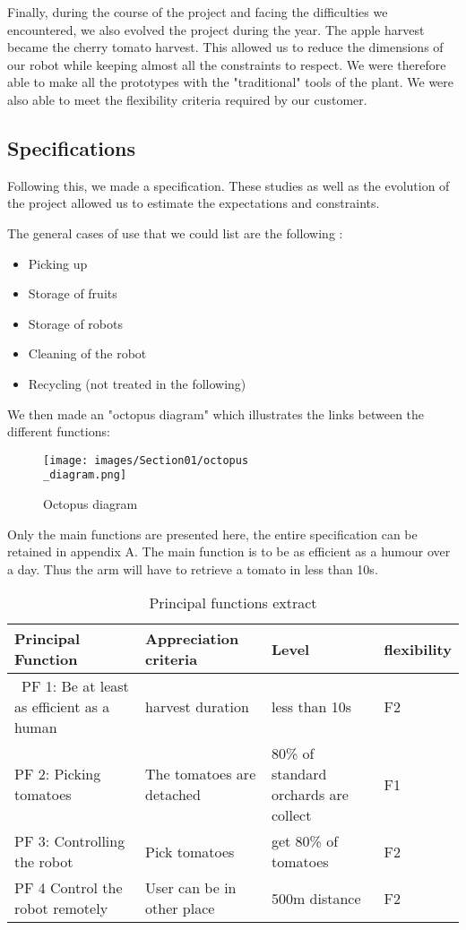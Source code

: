 \bigbreak
Finally, during the course of the project and facing the difficulties we encountered, we also evolved the project during the year. The apple harvest became the cherry tomato harvest. This allowed us to reduce the dimensions of our robot while keeping almost all the constraints to respect. We were therefore able to make all the prototypes with the "traditional" tools of the plant. We were also able to meet the flexibility criteria required by our customer. 

\subsection{Specifications}

Following this, we made a specification. These studies as well as the evolution of the project allowed us to estimate the expectations and constraints. 

\bigbreak
\noindent The general cases of use that we could list are the following : 
\begin{itemize}[noitemsep]
    \item Picking up
    \item Storage of fruits
    \item Storage of robots
    \item Cleaning of the robot
    \item Recycling (not treated in the following)
\end{itemize}

We then made an "octopus diagram" which illustrates the links between the different functions: 
\begin{figure}[ht]
    \centering
    \texttt{[image: images/Section01/octopus\\\_diagram.png]}
    \caption{Octopus diagram}
    \label{fig:mesh1}
\end{figure}

\bigbreak
Only the main functions are presented here, the entire specification can be retained in appendix A. The main function is to be as efficient as a humour over a day. Thus the arm will have to retrieve a tomato in less than 10s. 

\begin{table}[ht]
    \centering  
    \begin{tabular}{|p{3cm} | p{3cm} | p{3cm} | p{3cm} |} 
        \hline
        \textbf{Principal Function} & \textbf{Appreciation criteria} & \textbf{Level} & \textbf{flexibility} \\ [0.5ex] 
        \hline\
        PF 1: Be at least as efficient as a human & harvest duration & less than 10s & F2 \\ 
        \hline
        PF 2: Picking tomatoes & The tomatoes are detached & 80\% of standard orchards are collect & F1 \\
        \hline
        PF 3: Controlling the robot & Pick tomatoes & get 80\% of tomatoes & F2 \\
        \hline
        PF 4 Control the robot remotely  & User can be in other place & 500m distance & F2 \\
        \hline
    \end{tabular}
    \caption{Principal functions extract}
\end{table}

